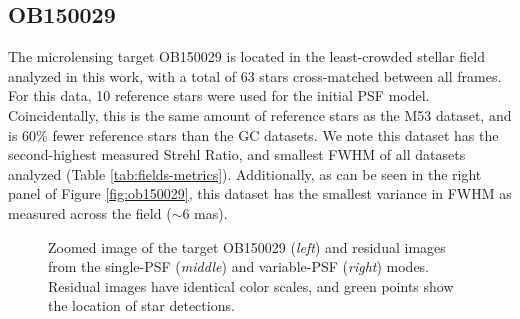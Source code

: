 \documentclass[]{spie}  %
\begin{document}
\subsection{OB150029} \label{sec:results-ob150029}

\indent The microlensing target OB150029 is located in the least-crowded stellar field analyzed in this work, with a total of 63 stars cross-matched between all frames. For this data, 10 reference stars were used for the initial PSF model. Coincidentally, this is the same amount of reference stars as the M53 dataset, and is 60\% fewer reference stars than the GC datasets. We note this dataset has the second-highest measured Strehl Ratio, and smallest FWHM of all datasets analyzed (Table \ref{tab:fields-metrics}). Additionally, as can be seen in the right panel of Figure \ref{fig:ob150029}, this dataset has the smallest variance in FWHM as measured across the field (${\sim}6$ mas). 

\begin{figure}[!h]
 \caption{\footnotesize Zoomed image of the target OB150029 (\textit{left}) and residual images from the single-PSF (\textit{middle}) and variable-PSF (\textit{right}) modes. Residual images have identical color scales, and green points show the location of star detections.} \label{fig:ob150029-targ-res}
\end{figure}
\end{document}
